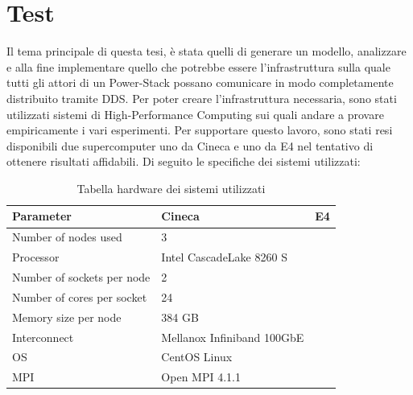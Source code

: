 \chapter{Test}
Il tema principale di questa tesi, è stata quelli di generare un modello, analizzare e alla fine implementare quello che potrebbe essere l'infrastruttura sulla quale tutti gli attori di un Power-Stack 
possano comunicare in modo completamente distribuito tramite DDS. Per poter creare l'infrastruttura necessaria, sono stati utilizzati sistemi di High-Performance Computing sui quali andare a provare empiricamente i vari esperimenti. Per supportare questo lavoro, sono stati resi disponibili due supercomputer uno da Cineca\cite{Cineca} e uno da E4\cite{E4} nel tentativo di ottenere risultati affidabili. Di seguito le specifiche dei sistemi utilizzati:

\begin{table}[H]
\begin{center}
\begin{tabular}{l|l|l}
    \hline
    \textbf{Parameter} & \textbf{Cineca} & \textbf{E4} \\
    \hline
    Number of nodes used & 3 \\
    \hline
    Processor & Intel CascadeLake 8260 S \\
    \hline
    Number of sockets per node & 2 \\
    \hline
    Number of cores per socket & 24 \\
    \hline
    Memory size per node & 384 GB \\
    \hline
    Interconnect & Mellanox Infiniband 100GbE \\
    \hline
    OS & CentOS Linux \\ 
    \hline
    MPI & Open MPI  4.1.1 \\
    \hline
\end{tabular}
\end{center}
\caption{Tabella hardware dei sistemi utilizzati}
\label{table:hpc-cineca}
\end{table}


